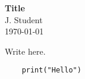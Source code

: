 \documentclass[12pt]{article}
\begin{document}
\begin{center}
  \Large \textbf{Title} \\
  \vspace{0.1in}
  \normalsize J. Student \\
  \today
\end{center}

Write here.

\begin{verbatim}
	print("Hello")
\end{verbatim}
\end{document}
